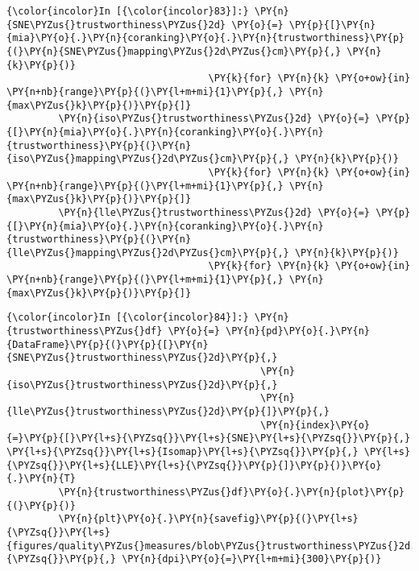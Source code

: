     \begin{Verbatim}[commandchars=\\\{\}]
{\color{incolor}In [{\color{incolor}83}]:} \PY{n}{SNE\PYZus{}trustworthiness\PYZus{}2d} \PY{o}{=} \PY{p}{[}\PY{n}{mia}\PY{o}{.}\PY{n}{coranking}\PY{o}{.}\PY{n}{trustworthiness}\PY{p}{(}\PY{n}{SNE\PYZus{}mapping\PYZus{}2d\PYZus{}cm}\PY{p}{,} \PY{n}{k}\PY{p}{)}
                                   \PY{k}{for} \PY{n}{k} \PY{o+ow}{in} \PY{n+nb}{range}\PY{p}{(}\PY{l+m+mi}{1}\PY{p}{,} \PY{n}{max\PYZus{}k}\PY{p}{)}\PY{p}{]}
         \PY{n}{iso\PYZus{}trustworthiness\PYZus{}2d} \PY{o}{=} \PY{p}{[}\PY{n}{mia}\PY{o}{.}\PY{n}{coranking}\PY{o}{.}\PY{n}{trustworthiness}\PY{p}{(}\PY{n}{iso\PYZus{}mapping\PYZus{}2d\PYZus{}cm}\PY{p}{,} \PY{n}{k}\PY{p}{)}
                                   \PY{k}{for} \PY{n}{k} \PY{o+ow}{in} \PY{n+nb}{range}\PY{p}{(}\PY{l+m+mi}{1}\PY{p}{,} \PY{n}{max\PYZus{}k}\PY{p}{)}\PY{p}{]}
         \PY{n}{lle\PYZus{}trustworthiness\PYZus{}2d} \PY{o}{=} \PY{p}{[}\PY{n}{mia}\PY{o}{.}\PY{n}{coranking}\PY{o}{.}\PY{n}{trustworthiness}\PY{p}{(}\PY{n}{lle\PYZus{}mapping\PYZus{}2d\PYZus{}cm}\PY{p}{,} \PY{n}{k}\PY{p}{)}
                                   \PY{k}{for} \PY{n}{k} \PY{o+ow}{in} \PY{n+nb}{range}\PY{p}{(}\PY{l+m+mi}{1}\PY{p}{,} \PY{n}{max\PYZus{}k}\PY{p}{)}\PY{p}{]}
\end{Verbatim}

    \begin{Verbatim}[commandchars=\\\{\}]
{\color{incolor}In [{\color{incolor}84}]:} \PY{n}{trustworthiness\PYZus{}df} \PY{o}{=} \PY{n}{pd}\PY{o}{.}\PY{n}{DataFrame}\PY{p}{(}\PY{p}{[}\PY{n}{SNE\PYZus{}trustworthiness\PYZus{}2d}\PY{p}{,}
                                            \PY{n}{iso\PYZus{}trustworthiness\PYZus{}2d}\PY{p}{,}
                                            \PY{n}{lle\PYZus{}trustworthiness\PYZus{}2d}\PY{p}{]}\PY{p}{,}
                                            \PY{n}{index}\PY{o}{=}\PY{p}{[}\PY{l+s}{\PYZsq{}}\PY{l+s}{SNE}\PY{l+s}{\PYZsq{}}\PY{p}{,} \PY{l+s}{\PYZsq{}}\PY{l+s}{Isomap}\PY{l+s}{\PYZsq{}}\PY{p}{,} \PY{l+s}{\PYZsq{}}\PY{l+s}{LLE}\PY{l+s}{\PYZsq{}}\PY{p}{]}\PY{p}{)}\PY{o}{.}\PY{n}{T}
         \PY{n}{trustworthiness\PYZus{}df}\PY{o}{.}\PY{n}{plot}\PY{p}{(}\PY{p}{)}
         \PY{n}{plt}\PY{o}{.}\PY{n}{savefig}\PY{p}{(}\PY{l+s}{\PYZsq{}}\PY{l+s}{figures/quality\PYZus{}measures/blob\PYZus{}trustworthiness\PYZus{}2d.png}\PY{l+s}{\PYZsq{}}\PY{p}{,} \PY{n}{dpi}\PY{o}{=}\PY{l+m+mi}{300}\PY{p}{)}
\end{Verbatim}

